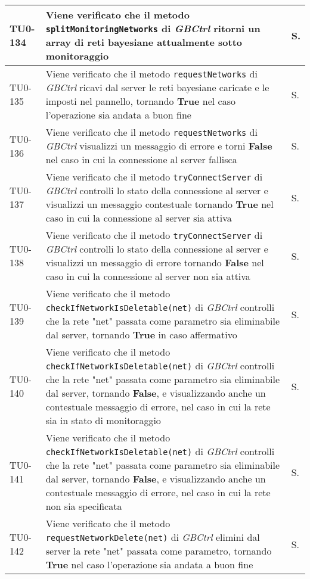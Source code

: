 \begin{longtable}{|C{.15\textwidth}|m{.66\textwidth}|C{.10\textwidth}|}
\hline
TU0-134 & Viene verificato che il metodo \texttt{splitMonitoringNetworks} di \textit{GBCtrl} ritorni un array di reti bayesiane attualmente sotto monitoraggio & S.\\
\hline
{}TU0-135 & Viene verificato che il metodo \texttt{requestNetworks} di \textit{GBCtrl} ricavi dal server le reti bayesiane caricate e le imposti nel pannello, tornando \textbf{True} nel caso l'operazione sia andata  a buon fine & S.\\
\hline
TU0-136 & Viene verificato che il metodo \texttt{requestNetworks} di \textit{GBCtrl} visualizzi un messaggio di errore e torni \textbf{False} nel caso in cui la connessione al server fallisca & S.\\
\hline
{}TU0-137 & Viene verificato che il metodo \texttt{tryConnectServer} di \textit{GBCtrl} controlli lo stato della connessione al server e visualizzi un messaggio contestuale tornando \textbf{True} nel caso in cui la connessione al server sia attiva & S.\\
\hline
TU0-138 & Viene verificato che il metodo \texttt{tryConnectServer} di \textit{GBCtrl} controlli lo stato della connessione al server e visualizzi un messaggio di errore tornando \textbf{False} nel caso in cui la connessione al server non sia attiva & S.\\
\hline
{}TU0-139 & Viene verificato che il metodo \texttt{checkIfNetworkIsDeletable(net)} di \textit{GBCtrl} controlli che la rete "net" passata come parametro sia eliminabile dal server, tornando \textbf{True} in caso affermativo & S.\\
\hline
TU0-140 & Viene verificato che il metodo \texttt{checkIfNetworkIsDeletable(net)} di \textit{GBCtrl} controlli che la rete "net" passata come parametro sia eliminabile dal server, tornando \textbf{False}, e visualizzando anche un contestuale messaggio di errore, nel caso in cui la rete sia in stato di monitoraggio & S.\\
\hline
{}TU0-141 & Viene verificato che il metodo \texttt{checkIfNetworkIsDeletable(net)} di \textit{GBCtrl} controlli che la rete "net" passata come parametro sia eliminabile dal server, tornando \textbf{False}, e visualizzando anche un contestuale messaggio di errore, nel caso in cui la rete non sia specificata & S.\\
\hline
TU0-142 & Viene verificato che il metodo \texttt{requestNetworkDelete(net)} di \textit{GBCtrl} elimini dal server la rete "net" passata come parametro, tornando \textbf{True} nel caso l'operazione sia andata a buon fine & S.\\

\end{longtable}
